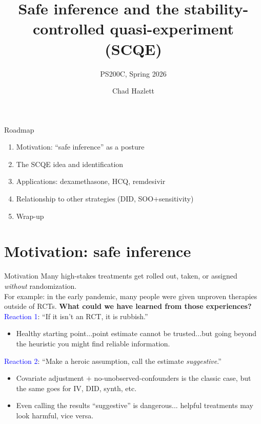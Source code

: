 \documentclass[handout,xcolor=dvipsnames,pdftex,hyperref={colorlinks=false}]{beamer}
\title[SCQE]{Safe inference and the stability-controlled quasi-experiment (SCQE)}
\subtitle[ ]{PS200C, Spring 2026}
\author[Hazlett]{Chad Hazlett}
\institute[UCLA]{UCLA\\[1ex]\texttt{chazlett@ucla.edu}}
\date{}
\newcommand\makegaps{\addtolength{\itemsep}{.25\baselineskip}}
\begin{document}
\subject{Talks}

\begin{frame}
  \titlepage
\end{frame}

\begin{frame}{Roadmap}
\begin{enumerate}\makegaps
  \item Motivation: ``safe inference'' as a posture
  \item The SCQE idea and identification
  \item Applications: dexamethasone, HCQ, remdesivir
  \item Relationship to other strategies (DID, SOO$+$sensitivity)
  \item Wrap-up
\end{enumerate}
\end{frame}

\section{Motivation: safe inference}

\begin{frame}{Motivation}
 Many high-stakes treatments get rolled out, taken, or assigned \emph{without} randomization.\\
\medskip
For example: in the early pandemic, many people were given unproven therapies outside of RCTs. \textbf{What could we have learned from those experiences?}\\
\bigskip
{} \textcolor{blue}{Reaction 1}: ``If it isn't an RCT, it is rubbish.''\\
\small
\begin{itemize}
\item Healthy starting point...point estimate cannot be trusted...but going beyond the heuristic you might find reliable information.
\end{itemize}
\medskip
\normalsize
{} \textcolor{blue}{Reaction 2}: ``Make a heroic assumption, call the estimate \emph{suggestive}.''\\
\small
\begin{itemize}
  \item Covariate adjustment $+$ no-unobserved-confounders is the classic case, but the same goes for IV, DID, synth, etc.
  \item Even calling the results ``suggestive'' is dangerous... helpful treatments may look harmful, vice versa.
\end{itemize}
\end{frame}
\end{document}
